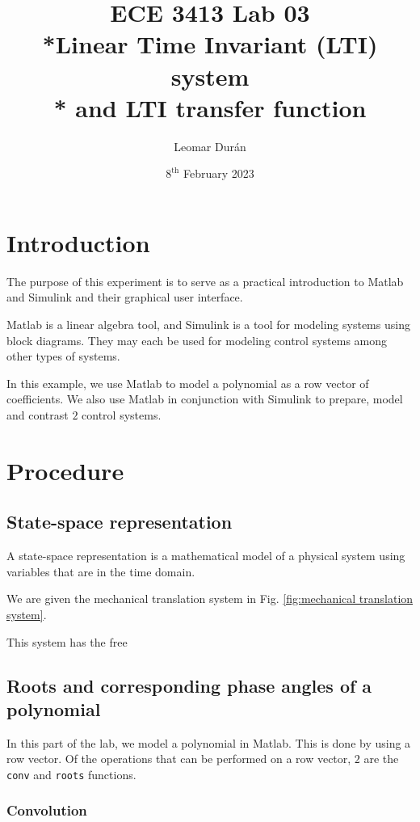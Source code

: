 \documentclass[12pt]{article}
\title{ECE 3413 Lab 03\\*Linear Time Invariant (LTI) system\\* and LTI transfer function}
\author{Leomar Dur\'an}
\date{$8^{\text{th}}$ February 2023}
\begin{document}
\maketitle
\newpage

\section{Introduction}

The purpose of this experiment is to serve as a practical introduction to Matlab and Simulink and their graphical user interface.

Matlab is a linear algebra tool, and Simulink is a tool for modeling systems using block diagrams.
They may each be used for modeling control systems among other types of systems.

In this example, we use Matlab to model a polynomial as a row vector of coefficients.
We also use Matlab in conjunction with Simulink to prepare, model and contrast $2$ control systems.

\section{Procedure}

\subsection{State-space representation}

A state-space representation is a mathematical model of a physical system using variables that are in the time domain.

We are given the mechanical translation system in Fig. \ref{fig:mechanical translation system}.

This system has the free 


\subsection{Roots and corresponding phase angles of a polynomial}

In this part of the lab, we model a polynomial in Matlab.
This is done by using a row vector.
Of the operations that can be performed on a row vector, $2$ are the \texttt{conv} and \texttt{roots} functions.

\subsubsection{Convolution}\label{sss:conv}
\end{document}
